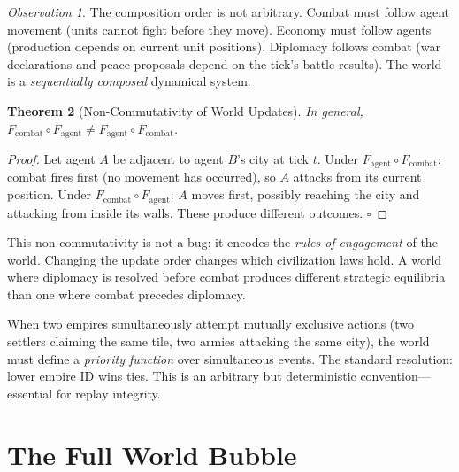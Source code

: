 \documentclass[11pt,a4paper,openany]{book}
\theoremstyle{plain}
\newtheorem{theorem}{Theorem}[chapter]
\theoremstyle{definition}
\theoremstyle{remark}
\newtheorem{observation}[theorem]{Observation}
\newenvironment{mechanic}[1]{%
  \begin{tcolorbox}[
    title={\textbf{World Mechanic:} #1},
    colback=sphereteal!5,
    colframe=sphereteal,
    fonttitle=\bfseries\color{white},
    coltitle=white,
    sharp corners,
    breakable,
    before upper={\normalfont\setlength{\parindent}{0pt}\tolerance=9999\hbadness=9999}
  ]
}{\end{tcolorbox}}
\newcommand{\Fagent}{F_{\mathrm{agent}}}
\newcommand{\Fcombat}{F_{\mathrm{combat}}}
\begin{document}
\begin{observation}
  The composition order is not arbitrary. Combat must follow agent movement
  (units cannot fight before they move). Economy must follow agents
  (production depends on current unit positions). Diplomacy follows combat
  (war declarations and peace proposals depend on the tick's battle results).
  The world is a \emph{sequentially composed} dynamical system.
\end{observation}

\begin{theorem}[Non-Commutativity of World Updates]
  In general, $\Fcombat \circ \Fagent \neq \Fagent \circ \Fcombat$.
\end{theorem}
\begin{proof}
  Let agent $A$ be adjacent to agent $B$'s city at tick $t$.
  Under $\Fagent \circ \Fcombat$: combat fires first (no movement has
  occurred), so $A$ attacks from its current position. Under
  $\Fcombat \circ \Fagent$: $A$ moves first, possibly reaching the city
  and attacking from inside its walls. These produce different outcomes.
  $\square$
\end{proof}

This non-commutativity is not a bug: it encodes the \emph{rules of engagement}
of the world. Changing the update order changes which civilization laws hold.
A world where diplomacy is resolved before combat produces different strategic
equilibria than one where combat precedes diplomacy.

\begin{mechanic}{Race Conditions as World Events}
  When two empires simultaneously attempt mutually exclusive actions
  (two settlers claiming the same tile, two armies attacking the same city),
  the world must define a \emph{priority function} over simultaneous events.
  The standard resolution: lower empire ID wins ties. This is an arbitrary
  but deterministic convention---essential for replay integrity.
\end{mechanic}

\section{The Full World Bubble}
\end{document}
